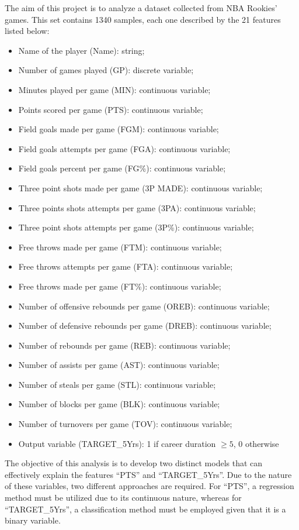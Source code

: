 The aim of this project is to analyze a dataset collected from NBA Rookies' games. This set contains 1340 samples, each one described by the 21 features listed below: 
\begin{itemize}
	\item Name of the player (Name): string;
	\item Number of games played (GP): discrete variable;
	\item Minutes played per game (MIN): continuous variable;
	\item Points scored per game (PTS): continuous variable;
	\item Field goals made per game (FGM): continuous variable;
	\item Field goals attempts per game (FGA): continuous variable;
	\item Field goals percent per game (FG\%): continuous variable;
	\item Three point shots made per game (3P MADE): continuous variable;
	\item Three points shots attempts per game (3PA): continuous variable;
	\item Three point shots attempts per game (3P\%): continuous variable;
	\item Free throws made per game (FTM): continuous variable;
	\item Free throws attempts per game (FTA): continuous variable;
	\item Free throws made per game (FT\%): continuous variable;
	\item Number of offensive rebounds per game (OREB): continuous variable;
	\item Number of defensive rebounds per game (DREB): continuous variable;
	\item Number of rebounds per game (REB): continuous variable;
	\item Number of assists per game (AST): continuous variable;
	\item Number of steals per game (STL): continuous variable;
	\item Number of blocks per game (BLK): continuous variable;
	\item Number of turnovers per game (TOV): continuous variable;
	\item Output variable (TARGET\_5Yrs): 1 if career duration $\geq 5$, 0 otherwise\\
\end{itemize} 

The objective of this analysis is to develop two distinct models that can effectively explain the features ``PTS'' and ``TARGET\_5Yrs''. Due to the nature of these variables, two different approaches are required. For ``PTS'', a regression method must be utilized due to its continuous nature, whereas for ``TARGET\_5Yrs'', a classification method must be employed given that it is a binary variable.